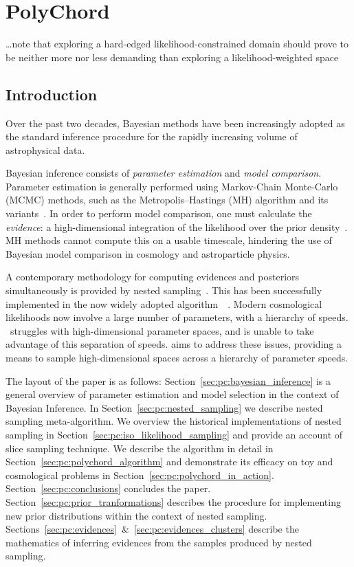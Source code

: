 \chapter{PolyChord}
\label{chap:pc}

\epigraph{\ldots note that exploring a hard-edged likelihood-constrained domain should prove to be neither more nor less demanding than exploring a likelihood-weighted space }{\johnskilling{}}

\section{Introduction}
\label{sec:pc:introduction}
Over the past two decades, Bayesian methods have been increasingly adopted as the standard inference procedure for the rapidly increasing volume of astrophysical data.

Bayesian inference consists of {\em parameter estimation\/} and {\em model comparison}.  Parameter estimation is generally performed using Markov-Chain Monte-Carlo (MCMC) methods, such as the Metropolis--Hastings (MH) algorithm and its variants~\citep{Mackay}.  In order to perform model comparison, one must calculate the {\em evidence\/}: a high-dimensional integration of the likelihood over the prior density~\citep{Sivia}.  MH methods cannot compute this on a usable timescale, hindering the use of Bayesian model comparison in cosmology and astroparticle physics.

A contemporary methodology for computing evidences and posteriors simultaneously is provided by nested sampling~\citep{skilling2006}. This has been successfully implemented in the now widely adopted algorithm \MultiNest\,~\citep{MultiNest1,MultiNest2,MultiNest3}.  Modern cosmological likelihoods now involve a large number of parameters, with a hierarchy of speeds.  \MultiNest\ struggles with high-dimensional parameter spaces, and is unable to take advantage of this separation of speeds.  \PolyChord{} aims to address these issues, providing a means to sample high-dimensional spaces across a hierarchy of parameter speeds.

The layout of the paper is as follows:
Section~\ref{sec:pc:bayesian_inference} is a general overview of parameter estimation and model selection in the context of Bayesian Inference.
In Section~\ref{sec:pc:nested_sampling} we describe  nested sampling meta-algorithm.
We overview the historical implementations of nested sampling in Section~\ref{sec:pc:iso_likelihood_sampling} and provide an account of  slice sampling technique.
We describe the \PolyChord{} algorithm in detail in Section~\ref{sec:pc:polychord_algorithm} and demonstrate its efficacy on toy and cosmological problems in Section~\ref{sec:pc:polychord_in_action}.  
Section~\ref{sec:pc:conclusions} concludes the paper.
Section~\ref{sec:pc:prior_tranformations} describes the procedure for implementing new prior distributions within the context of nested sampling.
Sections~\ref{sec:pc:evidences}~\&~\ref{sec:pc:evidences_clusters} describe the mathematics of inferring evidences from the samples produced by nested sampling.

